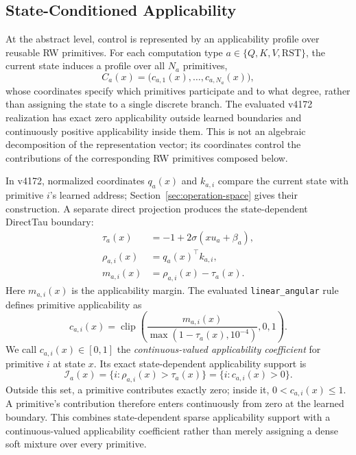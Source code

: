 \documentclass{article}
\begin{document}
\subsection{State-Conditioned Applicability}
\label{sec:applicability}

At the abstract level, control is represented by an applicability profile over
reusable RW primitives. For each computation type
\(a\in\{Q,K,V,\mathrm{RST}\}\), the current state induces a profile over all
\(N_a\) primitives,
\begin{equation}
C_a(x)=\big(c_{a,1}(x),\ldots,c_{a,N_a}(x)\big),
\label{eq:applicability_profile}
\end{equation}
whose coordinates specify which primitives participate and to what degree,
rather than assigning the state to a single discrete branch. The evaluated
v4172 realization has exact zero applicability outside learned boundaries and
continuously positive applicability inside them. This is not an algebraic
decomposition of the representation vector; its coordinates control the
contributions of the corresponding RW primitives composed below.

In v4172, normalized coordinates \(q_a(x)\) and \(k_{a,i}\) compare the current
state with primitive \(i\)'s learned address;
Section~\ref{sec:operation-space} gives their construction. A separate direct
projection produces the state-dependent DirectTau boundary:
\begin{align}
\tau_a(x)&=-1+2\sigma(xu_a+\beta_a),\\
\rho_{a,i}(x)&=q_a(x)^\top k_{a,i},\\
m_{a,i}(x)&=\rho_{a,i}(x)-\tau_a(x).
\label{eq:directtau}
\end{align}
Here \(m_{a,i}(x)\) is the applicability margin. The evaluated
\texttt{linear\_angular} rule defines primitive applicability as
\begin{equation}
c_{a,i}(x)=
\operatorname{clip}\!\left(
\frac{m_{a,i}(x)}
{\max(1-\tau_a(x),10^{-4})},0,1\right).
\label{eq:angular_gate}
\end{equation}
We call \(c_{a,i}(x)\in[0,1]\) the \emph{continuous-valued applicability
coefficient} for primitive \(i\) at state \(x\). Its exact state-dependent
applicability support is
\begin{equation}
\mathcal{I}_a(x)=\{i:\rho_{a,i}(x)>\tau_a(x)\}
=\{i:c_{a,i}(x)>0\}.
\label{eq:applicable_support}
\end{equation}
Outside this set, a primitive contributes exactly zero; inside it,
\(0<c_{a,i}(x)\leq1\). A primitive's contribution therefore enters
continuously from zero at the learned boundary. This combines state-dependent
sparse applicability support with a continuous-valued applicability coefficient rather than
merely assigning a dense soft mixture over every primitive.
\end{document}
